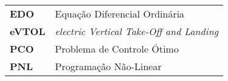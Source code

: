 \begin{longtable}{ll}
    \textbf{EDO} & Equação Diferencial Ordinária \\
    \textbf{eVTOL} & \textit{electric Vertical Take-Off and Landing} \\
    \textbf{PCO} & Problema de Controle Ótimo \\
    \textbf{PNL} & Programação Não-Linear \\
\end{longtable}

